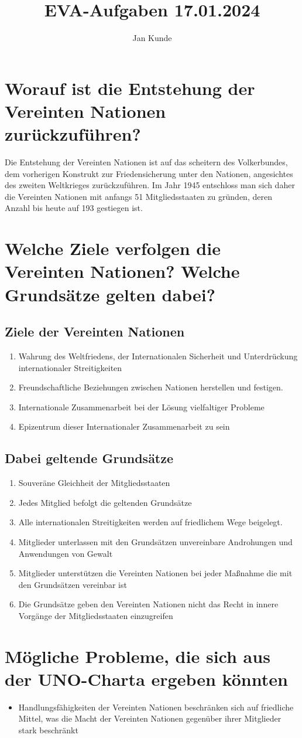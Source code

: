 \documentclass[12pt]{article}
\title{EVA-Aufgaben 17.01.2024}
\author{Jan Kunde}
\begin{document}
\maketitle
\section{Worauf ist die Entstehung der Vereinten Nationen zurückzuführen? }
Die Entstehung der Vereinten Nationen ist auf das scheitern des Volkerbundes, dem vorherigen Konstrukt
zur Friedensicherung unter den Nationen, angesichtes des zweiten Weltkrieges zurückzuführen. Im Jahr 1945 entschloss
man sich daher die Vereinten Nationen mit anfangs 51 Mitgliedsstaaten zu gründen,
 deren Anzahl bis heute auf 193 gestiegen ist.
\section{Welche Ziele verfolgen die Vereinten Nationen? Welche Grundsätze gelten dabei?}
\subsection{Ziele der Vereinten Nationen}
\begin{enumerate}
    \item Wahrung des Weltfriedens, der Internationalen Sicherheit und Unterdrückung internationaler Streitigkeiten
    \item Freundschaftliche Beziehungen zwischen Nationen herstellen und festigen.
    \item Internationale Zusammenarbeit bei der Lösung vielfaltiger Probleme
    \item Epizentrum dieser Internationaler Zusammenarbeit zu sein
\end{enumerate}
\subsection{Dabei geltende Grundsätze}
\begin{enumerate}
    \item Souveräne Gleichheit der Mitgliedsstaaten
    \item Jedes Mitglied befolgt die geltenden Grundsätze
    \item Alle internationalen Streitigkeiten werden auf friedlichem Wege beigelegt.
    \item Mitglieder unterlassen mit den Grundsätzen unvereinbare Androhungen und Anwendungen von Gewalt
    \item Mitglieder unterstützen die Vereinten Nationen bei jeder Maßnahme die mit den Grundsätzen vereinbar ist
    \item Die Grundsätze geben den Vereinten Nationen nicht das Recht in innere Vorgänge der Mitgliedsstaaten einzugreifen
\end{enumerate}
\section{Mögliche Probleme, die sich aus der UNO-Charta ergeben könnten}
\begin{itemize}
    \item Handlungsfähigkeiten der Vereinten Nationen beschränken sich auf friedliche Mittel,
was die Macht der Vereinten Nationen gegenüber ihrer Mitglieder stark beschränkt 
\end{itemize}
\end{document}
